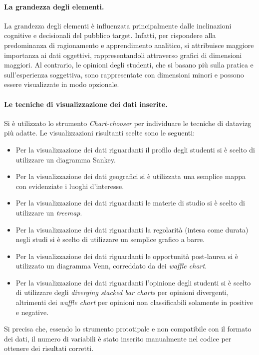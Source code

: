 \paragraph{La grandezza degli elementi.} La grandezza degli elementi è influenzata principalmente dalle inclinazioni cognitive e decisionali del pubblico target. 
Infatti, per rispondere alla predominanza di ragionamento e apprendimento analitico, si attribuisce maggiore importanza ai dati oggettivi, rappresentandoli attraverso grafici di dimensioni maggiori. 
Al contrario, le opinioni degli studenti, che si basano più sulla pratica e sull'esperienza soggettiva, sono rappresentate con dimensioni minori e possono essere visualizzate in modo opzionale.

\paragraph{Le tecniche di visualizzazione dei dati inserite.}
Si è utilizzato lo strumento \emph{Chart-chooser} per individuare le tecniche di \gls{datavizg} più adatte. 
Le visualizzazioni risultanti scelte sono le seguenti:
\begin{itemize}
    \item Per la visualizzazione dei dati riguardanti il profilo degli studenti si è scelto di utilizzare un diagramma Sankey. 
    \item Per la visualizzazione dei dati geografici si è utilizzata una semplice mappa con evidenziate i luoghi d'interesse.
    \item Per la visualizzazione dei dati riguardanti le materie di studio si è scelto di utilizzare un \emph{treemap}.
    \item Per la visualizzazione dei dati riguardanti la regolarità (intesa come durata) negli studi si è scelto di utilizzare un semplice grafico a barre.
    \item Per la visualizzazione dei dati riguardanti le opportunità post-laurea si è utilizzato un diagramma Venn, correddato da dei \emph{waffle chart}.
    \item Per la visualizzazione dei dati riguardanti l'opinione degli studenti si è scelto di utilizzare degli \emph{diverging stacked bar charts} per opinioni
    divergenti, altrimenti dei \emph{waffle chart} per opinioni non classificabili solamente in positive e negative.
\end{itemize}
Si precisa che, essendo lo strumento prototipale e non compatibile con il formato dei dati, il numero di variabili è stato inserito manualmente nel codice per ottenere dei risultati corretti.

